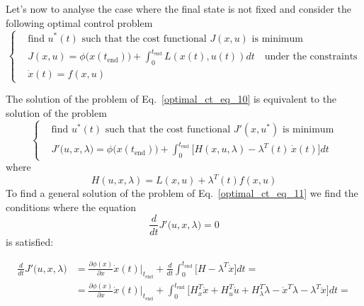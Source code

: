 \documentclass[12pt,a4paper,oneside]{book}
\begin{document}
\begin{onehalfspace}
Let's now to analyse the case where the final state is not fixed and consider 
the following optimal control problem
\begin{equation}\label{optimal_ct_eq_10}
	\left\lbrace \begin{aligned}
		& \text{find $u^*(t)$ such that the cost functional $J(x,u)$ is 
			minimum} \\[8pt]
		& J(x,u) = 
		\phi\big(x(t_{\text{end}})\big)+\int_{0}^{t_{\text{end}}}L(x(t),u(t))dt 
		\quad\text{under the constraints} \\[8pt]
		& \dot{x}(t)=f(x,u) 
	\end{aligned}\right. 
\end{equation}
\begin{mybox}
	The solution of the problem of Eq.~\eqref{optimal_ct_eq_10} is equivalent to 
	the solution of the problem
	\begin{equation}\label{optimal_ct_eq_11}
		\left\lbrace \begin{aligned}
			& \text{find $u^*(t)$ such that the cost functional $J'(x,u^*)$ is 
				minimum} \\[8pt]
			& J'\big(u,x,\lambda\big) = \phi\big(x(t_{\text{end}})\big) + 
			\int_{0}^{t_{\text{end}}}\Bigg[H(x,u,\lambda) - 
			\lambda^T(t)\,\dot{x}(t)\Bigg]dt
		\end{aligned}\right. 
	\end{equation}
	where
	\begin{equation}\label{optimal_ct_eq_12}
		H(u,x,\lambda) = L(x,u)+\lambda^T(t)f(x,u)
	\end{equation} 
	To find a general solution of the problem of Eq.~\eqref{optimal_ct_eq_11} we 
	find the conditions where the equation 
	\begin{equation}\frac{d}{dt}J'\big(u,x,\lambda\big)=0
	\end{equation} {is satisfied}:
\end{mybox}
\begin{equation}\label{optimal_ct_eq_13}
	\begin{aligned}
		\frac{d}{dt}J'\big(u,x,\lambda\big) &= \frac{\partial \phi(x)}{\partial 
			x}\dot{x}(t)\Big|_{t_{\text{end}}} + 
		\frac{d}{dt}\int_{0}^{t_{\text{end}}}\Bigg[H-\lambda^T\dot{x}\Bigg]dt = 
		\\[8pt]
		& = \frac{\partial \phi(x)}{\partial x}\dot{x}(t) \Big|_{t_{\text{end}}}
		+ \int_{0}^{t_{\text{end}}}\Bigg[H_x^T\dot{x} + H_u^T\dot{u} 
		+H_\lambda^T\dot{\lambda} - \dot{x}^T\dot{\lambda} 
		-\lambda^T\ddot{x}\Bigg]dt = \\[8pt]

\end{aligned}
\end{equation}
\end{onehalfspace}
\end{document}
